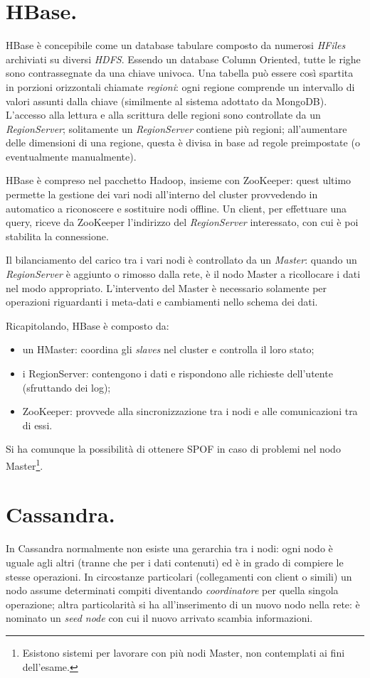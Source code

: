 \documentclass[a4page, 11pt]{article}
\begin{document}
\section{HBase.}
HBase è concepibile come un database tabulare composto da numerosi \textit{HFiles} archiviati su diversi \textit{HDFS}.
Essendo un database Column Oriented, tutte le righe sono contrassegnate da una chiave univoca.
Una tabella può essere così spartita in porzioni orizzontali chiamate \textit{regioni}: ogni regione comprende un intervallo di valori assunti dalla chiave (similmente al sistema adottato da MongoDB).
L'accesso alla lettura e alla scrittura delle regioni sono controllate da un \textit{RegionServer}; solitamente un \textit{RegionServer} contiene più regioni; all'aumentare delle dimensioni di una regione, questa è divisa in base ad regole preimpostate (o eventualmente manualmente).

HBase è compreso nel pacchetto Hadoop, insieme con ZooKeeper: quest ultimo permette la gestione dei vari nodi all'interno del cluster provvedendo in automatico a riconoscere e sostituire nodi offline.
Un client, per effettuare una query, riceve da ZooKeeper l'indirizzo del \textit{RegionServer} interessato, con cui è poi stabilita la connessione.

Il bilanciamento del carico tra i vari nodi è controllato da un \textit{Master}: quando un \textit{RegionServer} è aggiunto o rimosso dalla rete, è il nodo Master a ricollocare i dati nel modo appropriato.
L'intervento del Master è necessario solamente per operazioni riguardanti i meta-dati e cambiamenti nello schema dei dati.

Ricapitolando, HBase è composto da:
\begin{itemize}
\item un HMaster: coordina gli \textit{slaves} nel cluster e controlla il loro stato;
\item i RegionServer: contengono i dati e rispondono alle richieste dell'utente (sfruttando dei log);
\item ZooKeeper: provvede alla sincronizzazione tra i nodi e alle comunicazioni tra di essi.
\end{itemize}

Si ha comunque la possibilità di ottenere SPOF in caso di problemi nel nodo Master\footnote{Esistono sistemi per lavorare con più nodi Master, non contemplati ai fini dell'esame.}.

\section{Cassandra.}
In Cassandra normalmente non esiste una gerarchia tra i nodi: ogni nodo è uguale agli altri (tranne che per i dati contenuti) ed è in grado di compiere le stesse operazioni.
In circostanze particolari (collegamenti con client o simili) un nodo assume determinati compiti diventando \textit{coordinatore} per quella singola operazione; altra particolarità si ha all'inserimento di un nuovo nodo nella rete: è nominato un \textit{seed node} con cui il nuovo arrivato scambia informazioni.
\end{document}
